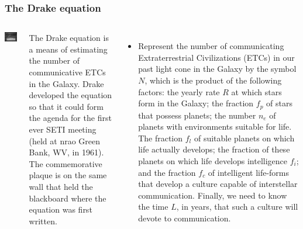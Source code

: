 \begin{frame}
\frametitle{The Drake equation}

\begin{columns}
\includegraphics[scale=0.35]{drake}

The Drake equation is a means of estimating the number of communicative ETCs in the Galaxy. Drake developed the equation so that it could form the agenda for the first ever SETI meeting (held at nrao Green Bank, WV, in 1961). The commemorative plaque is on the same wall that held the blackboard where the equation was first written.  

\begin{itemize}

\item Represent the number of communicating Extraterrestrial Civilizations (ETCs) in our past light cone in the Galaxy by the symbol $N$, which is the product of the following factors: the yearly rate $R$ at which stars form in the Galaxy; the fraction $f_p$ of stars that possess planets; the number $n_e$ of planets with environments suitable for life. The fraction $f_l$ of suitable planets on which life actually develops; the fraction of these planets on which life develops intelligence $f_i$; and the fraction $f_c$ of intelligent life-forms that develop a culture capable of interstellar communication. Finally, we need to know the time $L$, in years, that such a culture will devote to communication.   
\end{itemize}
\end{columns}
\end{frame}

